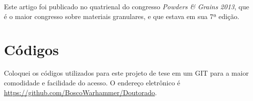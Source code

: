 \begin{apendicesenv}
    Este artigo foi publicado no quatrienal do congresso \textit{Powders \& Grains 2013}, que é o maior congresso sobre materiais granulares, e que estava em sua 7ª edição.



\chapter{Códigos}

    Coloquei os códigos utilizados para este projeto de tese em um GIT para a maior comodidade e facilidade do acesso. O endereço eletrônico é \url{https://github.com/BoscoWarhammer/Doutorado}.

\end{apendicesenv}
